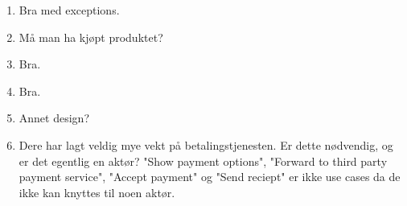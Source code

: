 \begin{enumerate}

\item {
Bra med exceptions.
}

\item {
Må man ha kjøpt produktet?
}

\item {
Bra.
}

\item {
Bra.
}

\item {
Annet design?
}

\item {
Dere har lagt veldig mye vekt på betalingstjenesten. Er dette nødvendig, og er det egentlig en aktør? "Show payment options", "Forward to third party payment service", "Accept payment" og "Send reciept" er ikke use cases da de ikke kan knyttes til noen aktør.
}

\end{enumerate}